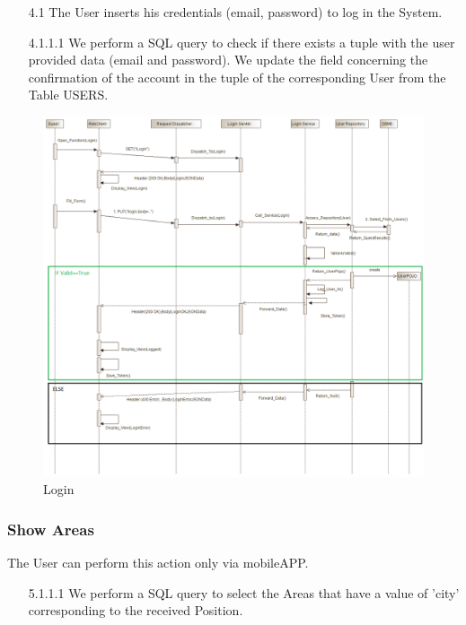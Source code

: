 \documentclass[12pt]{article}
\begin{document}
\begin{enumerate}
	\item[4.1] The User inserts his credentials (email, password) to log in the System.
	\item[4.1.1.1] We perform a SQL query to check if there exists a tuple with the user provided data (email and password). We update the field concerning the confirmation of the account in the tuple of the corresponding User from the Table USERS.
\end{enumerate}
\begin{figure}[h]
	\centering
	\includegraphics[width=.9\textwidth]{../Images/Sequence_Final/Login}
	\caption{Login}
\end{figure}
\clearpage

\subsubsection{Show Areas}
The User can perform this action only via mobileAPP.
\begin{enumerate}
	\item[5.1.1.1] We perform a SQL query to select the Areas that have a value of 'city' corresponding to the received Position.
\end{enumerate}
\end{document}
